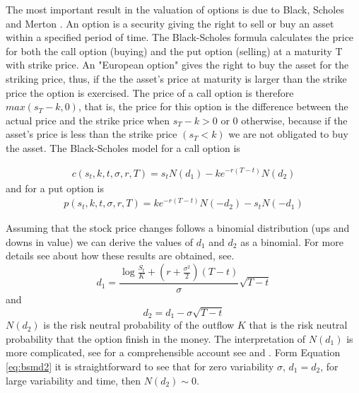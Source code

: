 \documentclass[11pt, onecolumn]{article}
\begin{document}
The most important result in the valuation of options is due to Black, Scholes and Merton \citep{black_pricing_1973}. An option is a security giving the right to sell or buy an asset within a specified period of time. The Black-Scholes formula calculates the price for both the call option (buying) and the put option (selling) at a maturity T with strike price. An "European option" gives the right to buy the asset for the striking price, thus, if the the asset's price at maturity is larger than the strike price the option is exercised. The price of a call option is therefore $max(s_T - k, 0)$, that is, the price for this option is the difference between the actual price and the strike price when $s_T - k >0$ or 0 otherwise, because if the asset's price is less than the strike price $(s_T < k)$ we are not obligated to buy the asset. 
The Black-Scholes model for a call option is

\begin{equation}
\begin{split}
 c(s_t,k,t,\sigma,r,T)  = s_t N(d_1) - k e^{-r(T-t)}N(d_2)
 \end{split}
  \label{eq:bsmcall}
\end{equation}
and for a put option is
 \begin{equation}
\begin{split}
 p(s_t,k,t,\sigma,r,T)  = ke^{-r(T-t)}N(-d_2)- s_tN(-d_1)
 \end{split}
  \label{eq:bsmput}
 \end{equation}
 
Assuming that the stock price changes follows a binomial distribution (ups and downs in value) we can derive the values of $d_1$ and $d_2$ as a binomial. For more details see about how these results are obtained, see\citep{hull_options_2011}.
 \begin{equation}
 d_1 =  \frac{\log \frac{S_t}{K} + (r + \frac{\sigma^2}{2})(T-t)  }\sigma \sqrt{T-t}{}
 \label{eq:bsmd1}
 \end{equation}
 and 
 \begin{equation}
 d_2 = d_1 - \sigma \sqrt{T-t}{}
 \label{eq:bsmd2}
 \end{equation}
$N(d_2)$ is the risk neutral probability of the outflow $K$ that is the risk neutral probability that the option finish in the money. %
The interpretation of $N(d_1)$ is more complicated, see \citep{} for a comprehensible account see \citep{hull_options_2005} and \citep{duffie_dynamic_2001}. 
Form Equation \ref{eq:bsmd2} it is straightforward to see that for zero variability $\sigma$, $d_1 = d_2$, for large variability and time, then $N(d_2)\sim 0$.  
\end{document}
